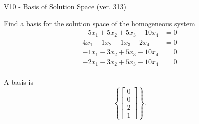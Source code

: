 \begin{exercise}
  \begin{exerciseTitle}V10 - Basis of Solution Space (ver. 313)\end{exerciseTitle}
  \begin{exerciseStatement}
    Find a basis for the solution space of the homogeneous system 
\begin{align*}
 -5 x_ 1 + 5 x_ 2 + 5 x_ 3 -10 x_ 4 &= 0  \\ 
  4 x_ 1 -1 x_ 2 + 1 x_ 3 -2 x_ 4 &= 0  \\ 
  -1 x_ 1 -3 x_ 2 + 5 x_ 3 -10 x_ 4 &= 0  \\ 
  -2 x_ 1 -3 x_ 2 + 5 x_ 3 -10 x_ 4 &= 0  \\ 
 \end{align*}


 
  \end{exerciseStatement}

  \begin{exerciseAnswer}
   A basis is   
\[\left\{\left[\begin{array}{c}
0 \\
0 \\
2 \\
1
\end{array}\right]\right\}.\]

  


  \end{exerciseAnswer}
\end{exercise}